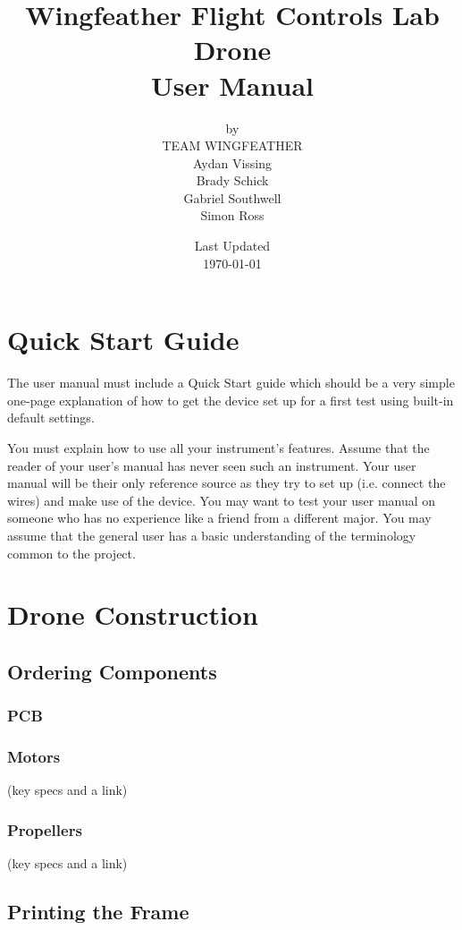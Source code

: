 \documentclass[12pt, titlepage]{article}
\title{\Huge Wingfeather Flight Controls Lab Drone \\ \Large{User Manual}}
\author{by \\ \Large TEAM WINGFEATHER \\ Aydan Vissing \\ Brady Schick \\ Gabriel Southwell \\ Simon Ross}
\date{\footnotesize{Last Updated} \\ \normalsize{\today}}
\begin{document}
\maketitle



\newpage
\tableofcontents

\newpage
\section{Quick Start Guide}

The user manual must include a Quick Start guide which should be a very simple one-page explanation of how to get the device set up for a first test using built-in default settings.

You must explain how to use all your instrument’s features. Assume that the reader of your user’s manual has never seen such an instrument. Your user manual will be their only reference source as they try to set up (i.e. connect the wires) and make use of the device. You may want to test your user manual on someone who has no experience like a friend from a different major. You may assume that the general user has a basic understanding of the terminology common to the project.

\section{Drone Construction}

\subsection{Ordering Components}
\subsubsection{PCB}

\subsubsection{Motors}
(key specs and a link)

\subsubsection{Propellers}
(key specs and a link)

\subsection{Printing the Frame}
\end{document}

